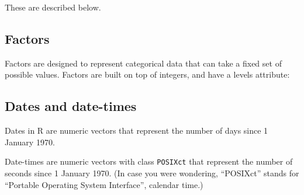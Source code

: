 \documentclass[]{book}
\newenvironment{Shaded}{\begin{snugshade}}{\end{snugshade}}
\newcommand{\KeywordTok}[1]{\textcolor[rgb]{0.13,0.29,0.53}{\textbf{{#1}}}}
\newcommand{\DataTypeTok}[1]{\textcolor[rgb]{0.13,0.29,0.53}{{#1}}}
\newcommand{\StringTok}[1]{\textcolor[rgb]{0.31,0.60,0.02}{{#1}}}
\newcommand{\CommentTok}[1]{\textcolor[rgb]{0.56,0.35,0.01}{\textit{{#1}}}}
\newcommand{\NormalTok}[1]{{#1}}
\begin{document}
These are described below.

\hypertarget{factors-1}{\subsection{Factors}\label{factors-1}}

Factors are designed to represent categorical data that can take a fixed
set of possible values. Factors are built on top of integers, and have a
levels attribute:

\begin{Shaded}
\end{Shaded}

\subsection{Dates and date-times}\label{dates-and-date-times}

Dates in R are numeric vectors that represent the number of days since 1
January 1970.

\begin{Shaded}
\end{Shaded}

Date-times are numeric vectors with class \texttt{POSIXct} that
represent the number of seconds since 1 January 1970. (In case you were
wondering, ``POSIXct'' stands for ``Portable Operating System
Interface'', calendar time.)
\end{document}
